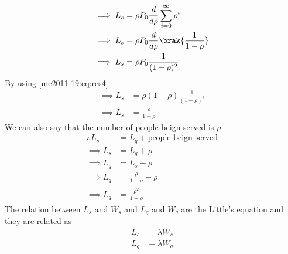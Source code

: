 \begin{itemize}
\begin{align}
    \implies L_s&=\rho P_0\frac{d}{d\rho}\sum_{i=0}^{\infty}\rho^i\\
    \implies L_s&=\rho P_0\frac{d}{d\rho}\brak{\frac{1}{1-\rho}}\\
    \implies L_s&=\rho P_0\frac{1}{(1-\rho)^2}
\end{align}
By using \eqref{me2011-19:eq:res4}
\begin{align}
    \implies L_s&=\rho(1-\rho)\frac{1}{(1-\rho)^2}\\
    \implies L_s&=\frac{\rho}{1-\rho}
\end{align}
We can also say that the number of people beign served is $\rho$
\begin{align}
    \therefore L_s&=L_q+\text{people beign served}\\
    \implies L_s&=L_q+\rho\\
    \implies L_q&=L_s-\rho\\
    \implies L_q&=\frac{\rho}{1-\rho}-\rho\\
    \implies L_q&=\frac{\rho^2}{1-\rho}
\end{align}
\newpage
The relation between $L_s$ and $W_s$ and $L_q$ and $W_q$ are the Little's equation and they are related as
\begin{align}
    L_s&=\lambda W_s\\
    L_q&=\lambda W_q
\end{align}
\end{itemize}
